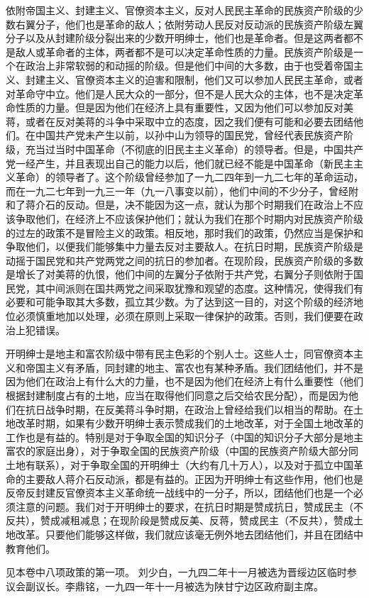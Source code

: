 依附帝国主义、封建主义、官僚资本主义，反对人民民主革命的民族资产阶级的少数右翼分子，他们也是革命的敌人；依附劳动人民反对反动派的民族资产阶级左翼分子以及从封建阶级分裂出来的少数开明绅士，他们也是革命者。但是这两者都不是敌人或革命者的主体，两者都不是可以决定革命性质的力量。民族资产阶级是一个在政治上非常软弱的和动摇的阶级。但是他们中间的大多数，由于也受着帝国主义、封建主义、官僚资本主义的迫害和限制，他们又可以参加人民民主革命，或者对革命守中立。他们是人民大众的一部分，但不是人民大众的主体，也不是决定革命性质的力量。但是因为他们在经济上具有重要性，又因为他们可以参加反对美蒋，或者在反对美蒋的斗争中采取中立的态度，因之我们便有可能和必要去团结他们。在中国共产党未产生以前，以孙中山为领导的国民党，曾经代表民族资产阶级，充当过当时中国革命（不彻底的旧民主主义革命）的领导者。但是，中国共产党一经产生，并且表现出自己的能力以后，他们就已经不能是中国革命（新民主主义革命）的领导者了。这个阶级曾经参加了一九二四年到一九二七年的革命运动，而在一九二七年到一九三一年（九一八事变以前），他们中间的不少分子，曾经附和了蒋介石的反动。但是，决不能因为这一点，就认为那个时期我们在政治上不应该争取他们，在经济上不应该保护他们；就认为我们在那个时期内对民族资产阶级的过左的政策不是冒险主义的政策。相反地，那时我们的政策，仍然应当是保护和争取他们，以便我们能够集中力量去反对主要敌人。在抗日时期，民族资产阶级是动摇于国民党和共产党两党之间的抗日的参加者。在现阶段，民族资产阶级的多数是增长了对美蒋的仇恨，他们中间的左翼分子依附于共产党，右翼分子则依附于国民党，其中间派则在国共两党之间采取犹豫和观望的态度。这种情况，使得我们有必要和可能争取其大多数，孤立其少数。为了达到这一目的，对这个阶级的经济地位必须慎重地加以处理，必须在原则上采取一律保护的政策。否则，我们便要在政治上犯错误。

开明绅士是地主和富农阶级中带有民主色彩的个别人士。这些人士，同官僚资本主义和帝国主义有矛盾，同封建的地主、富农也有某种矛盾。我们团结他们，并不是因为他们在政治上有什么大的力量，也不是因为他们在经济上有什么重要性（他们根据封建制度占有的土地，应当在取得他们同意之后交给农民分配），而是因为他们在抗日战争时期，在反美蒋斗争时期，在政治上曾经给我们以相当的帮助。在土地改革时期，如果有少数开明绅士表示赞成我们的土地改革，对于全国土地改革的工作也是有益的。特别是对于争取全国的知识分子（中国的知识分子大部分是地主富农的家庭出身），对于争取全国的民族资产阶级（中国的民族资产阶级大部分同土地有联系），对于争取全国的开明绅士（大约有几十万人），以及对于孤立中国革命的主要敌人蒋介石反动派，都是有益的。正因为开明绅士有这些作用，他们也是反帝反封建反官僚资本主义革命统一战线中的一分子，所以，团结他们也是一个必须注意的问题。我们对于开明绅士的要求，在抗日时期是赞成抗日，赞成民主（不反共），赞成减租减息；在现阶段是赞成反美、反蒋，赞成民主（不反共），赞成土地改革。只要他们能够这样做，我们就应该毫无例外地去团结他们，并且在团结中教育他们。


\begin{maonote}
见本卷中八项政策的第一项。
刘少白，一九四二年十一月被选为晋绥边区临时参议会副议长。李鼎铭，一九四一年十一月被选为陕甘宁边区政府副主席。
\end{maonote}
